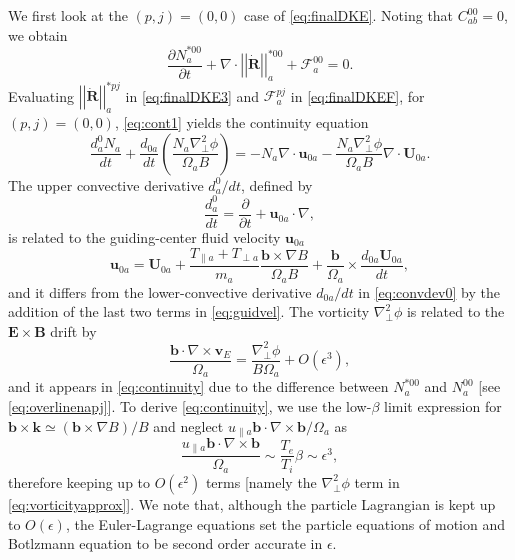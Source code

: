 {{We first look at the $(p,j)=(0,0)$ case of \cref{eq:finalDKE}. Noting that $C_{ab}^{00}=0$, we obtain
%
\begin{equation}
    \frac{\partial N_a^{*00}}{\partial t}+\nabla \cdot \left|\left|\dot{\mathbf R}\right|\right|^{*00}_a + \mathcal{F}_a^{00}=0.
    \label{eq:cont1}
\end{equation}
%
Evaluating $\left|\left|\dot{\mathbf R}\right|\right|^{*pj}_a$ in \cref{eq:finalDKE3} and $\mathcal{F}_a^{pj}$ in \cref{eq:finalDKEF}, for $(p,j)=(0,0)$, \cref{eq:cont1} yields the continuity equation
%
\begin{equation}
    \frac{d_a^0 N_a}{dt} + \frac{d_{0 a}}{dt}\left(\frac{N_a\nabla_\perp^2 \phi}{\Omega_a B}\right) = -N_a \nabla \cdot \mathbf u_{0 a} - \frac{N_a\nabla_\perp^2 \phi}{\Omega_a B}\nabla \cdot \mathbf U_{0 a}.
    \label{eq:continuity}
\end{equation}
%
The upper convective derivative ${d_a^0}/{dt}$, defined by
%
\begin{equation}
    \frac{d_a^0}{dt}=\frac{\partial}{\partial t} + \mathbf u_{0a} \cdot \nabla,
    \label{eq:convectop0}
\end{equation}
%
is related to the guiding-center fluid velocity $\mathbf u_{0a}$
%
\begin{equation}
    \mathbf u_{0a} = \mathbf U_{0a} + \frac{T_{\parallel a}+T_{\perp a}}{m_a}\frac{\mathbf b \times \nabla B}{\Omega_a B} +\frac{\mathbf b}{\Omega_a}\times \frac{d_{0 a} \mathbf U_{0 a}}{dt},
    \label{eq:guidvel}
\end{equation}
%
and it differs from the lower-convective derivative ${d_{0a}}/{dt}$ in \cref{eq:convdev0} by the addition of the last two terms in \cref{eq:guidvel}.
The vorticity $\nabla_\perp^2 \phi$ is related to the $\mathbf E \times \mathbf B$ drift by
%
\begin{equation}
    \frac{\mathbf b \cdot \nabla \times \mathbf v_E}{\Omega_a} = \frac{\nabla_\perp^2 \phi}{B \Omega_a} + O(\epsilon^3),
    \label{eq:vorticityapprox}
\end{equation}
%
and it appears in \cref{eq:continuity} due to the difference between $N_a^{*00}$ and $N_a^{00}$ [see \cref{eq:overlinenapj}].
To derive \cref{eq:continuity}, we use the low-$\beta$ limit expression for $\mathbf b \times \mathbf k \simeq (\mathbf b \times \nabla B)/B$ and neglect $u_{\parallel a}\mathbf b \cdot \nabla \times \mathbf b/\Omega_a$ as
%
\begin{equation}
    \frac{u_{\parallel a} \mathbf b \cdot \nabla \times \mathbf b}{\Omega_a} \sim \frac{T_e}{T_i}\beta \sim \epsilon^3,
    \label{eq:bcurlbapprox}
\end{equation}
%
therefore keeping up to $O(\epsilon^2)$ terms [namely the $\nabla_\perp^2 \phi$ term in \cref{eq:vorticityapprox}].
%
We note that, although the particle Lagrangian is kept up to $O(\epsilon)$, the Euler-Lagrange equations set the particle equations of motion and Botlzmann equation to be second order accurate in $\epsilon$.

}}
